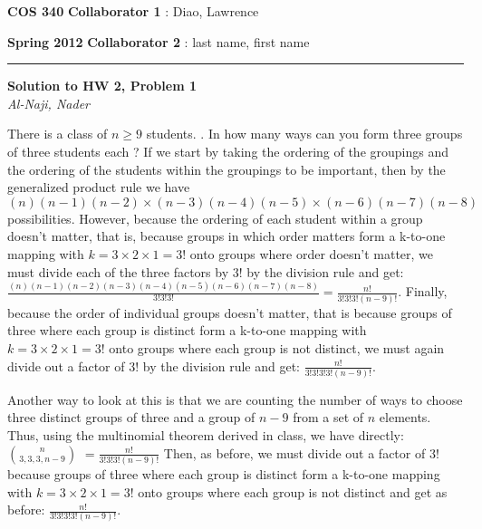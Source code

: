 \documentclass[12pt]{article}
\newcommand{\myheader}[4]
{\vspace*{-0.5in}
\noindent
{#1} \hfill {#3}

\noindent
{#2} \hfill {#4}

\noindent
\rule[8pt]{\textwidth}{1pt}

\vspace{1ex} 
}  %
\newcommand{\myalgsheader}[0]
{\myheader
{ {\bf{COS 340}} }
{ {\bf{Spring 2012}} }
{ {\bf{Collaborator 1}} : Diao, Lawrence }
{ {\bf{Collaborator 2}} : last name, first name}
}
\newcommand{\myhwtitle}[3]
{\begin{center}
{\large {\bf Solution to HW {#1}, Problem {#2}}}\\
\medskip 
{\it {#3}} %
\end{center}}
\begin{document}
\myalgsheader

\pagestyle{plain}

\myhwtitle{2}{1}{Al-Naji, Nader}

\bigskip

There is a class of $n \geq 9$ students.
. In how many ways can you form three groups of three students each ?
\newline
\newline
If we start by taking the ordering of the groupings and the ordering of the students within
the groupings to be important, then by the generalized product rule we have 
\newline
$(n)(n-1)(n-2) \times (n-3)(n-4)(n-5) \times (n-6)(n-7)(n-8)$
\newline
possibilities. However, because the ordering of each student within a group doesn't matter,
that is, because groups in which order matters form a k-to-one  mapping with $k = 3\times 2\times 1 = 3!$ onto groups where
order doesn't matter, we must divide each of the three factors by $3!$ by the division rule and get: 
\newline
\newline
$\frac{(n)(n-1)(n-2)(n-3)(n-4)(n-5)(n-6)(n-7)(n-8)}{3!3!3!}
= \frac{n!}{3!3!3!(n-9)!}$.
\newline
\newline
Finally, because the order of individual groups doesn't matter, that is because groups of three where
each group is distinct form a k-to-one mapping with $k = 3\times 2\times 1 = 3!$ onto groups where
each group is not distinct, we must again divide out a factor of 3! by the division rule and get:
\newline
\newline
$\frac{n!}{3!3!3!3!(n-9)!}$.
\newline
\newline

Another way to look at this is that we are counting the number of ways to choose three distinct groups
of three and a group of $n-9$ from a set of $n$ elements. Thus, using the multinomial theorem
derived in class, we have directly:
\newline
\newline
$n \choose {3, 3, 3, n-9}$ $ = \frac{n!}{3!3!3!(n-9)!}$
\newline
\newline
Then, as before, we must divide out a factor of $3!$ because groups of three where
each group is distinct form a k-to-one mapping with $k = 3\times 2\times 1 = 3!$ onto groups where
each group is not distinct and get as before:
\newline
\newline
$\frac{n!}{3!3!3!3!(n-9)!}$.
\newline
\newline
\end{document}
